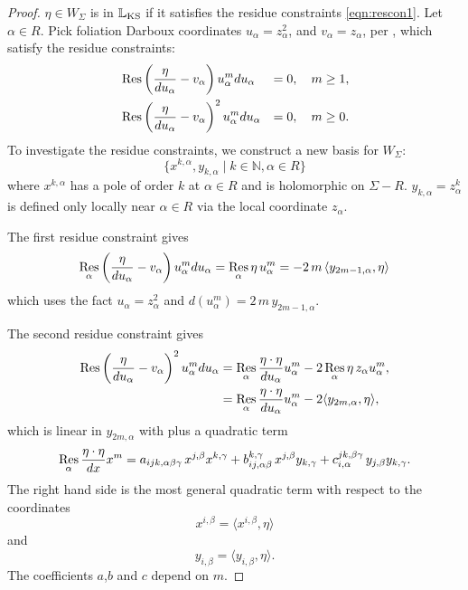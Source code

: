     \begin{proof}
    \(\eta \in W_\Sigma\) is in \(\mathbb{L}_{\text{KS}}\) if it satisfies the residue constraints \eqref{eqn:rescon1}. 
    Let \(\alpha \in R\). Pick foliation Darboux coordinates \(u_\alpha=z^2_\alpha\), and  \(v_\alpha=z_\alpha\), per \cite{chaimanowong2020airy,ks_airy}, which satisfy the residue constraints:
    \begin{alignat*}{3} 
    &\operatorname*{Res}\left(\frac{\eta}{du_\alpha}-v_\alpha\right)u_\alpha^mdu_\alpha   &=0,\quad m\geq 1,\\
    &\operatorname*{Res}\left(\frac{\eta}{du_\alpha}-v_\alpha\right)^2u_\alpha^mdu_\alpha &=0,\quad m\geq 0.
    \end{alignat*}
    To investigate the residue constraints, we construct a new basis for \(W_\Sigma\): 
    \[\{x^{k,\alpha},y_{k,\alpha}\mid k\in\mathbb{N},\alpha\in R\}\]
    where \(x^{k,\alpha}\) has a pole of order \(k\) at \(\alpha \in R\) and is holomorphic on \(\Sigma-R\). \(y_{k,\alpha}=z_\alpha^k\) is defined only locally near \(\alpha \in R\) via the local coordinate \(z_\alpha\).
    
    The first residue constraint gives 
    \[ \operatorname*{Res}_\alpha\left(\frac{\eta}{du_\alpha}-v_\alpha\right)u_\alpha^mdu_\alpha=\operatorname*{Res}_\alpha\eta\, u_\alpha^m=-2\,m\,\langle y_{2m-1,\alpha},\eta\rangle
    \]
    which uses the fact \(u_\alpha=z_\alpha^2\) and \(d(u_\alpha^m)=2\,m\,y_{2m-1,\alpha}\).
    
    The second residue constraint gives 
    \begin{align*}
    \operatorname*{Res}\left(\frac{\eta}{du_\alpha}-v_\alpha\right)^2u_\alpha^mdu_\alpha &= \operatorname*{Res}_\alpha\frac{\eta\cdot\eta }{du_\alpha}u_\alpha^m-2 \operatorname*{Res}_\alpha \eta\, z_\alpha u_\alpha^m,\\
    &=\operatorname*{Res}_\alpha\frac{\eta\cdot\eta }{du_\alpha}u_\alpha^m-2\langle y_{2m,\alpha},\eta\rangle,
    \end{align*} 
    which is linear in \(y_{2m,\alpha}\) with plus a quadratic term
    \begin{equation}
    \label{eqn:ff}
    \operatorname*{Res}_\alpha\frac{\eta\cdot\eta }{dx}x^m=a_{ijk,\alpha\beta\gamma} \, x^{j,\beta} x^{k,\gamma}+b_{ij,\alpha \beta}^{k,\gamma }\, x^{j,\beta} y_{k,\gamma}+c_{i ,\alpha}^{jk ,\beta \gamma}\, y_{j,\beta} y_{k,\gamma}.
    \end{equation}
    The right hand side is the most general quadratic term with respect to the coordinates \[x^{i,\beta}=\langle x^{i,\beta},\eta\rangle \] 
    and 
    \[ y_{i,\beta} =\langle y_{i,\beta},\eta\rangle.\]   
    The coefficients \(a\),\(b\) and \(c\) depend on \(m\).  
    

\end{proof}
